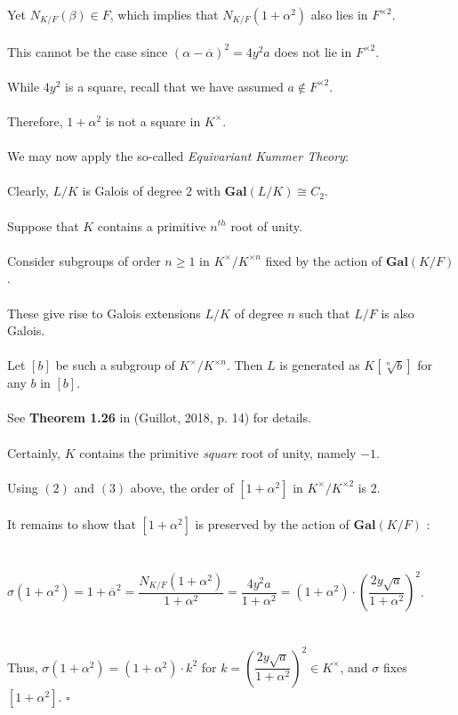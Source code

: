 \documentclass{article}
\begin{document}
Yet $N_{K/F}(\beta) \in F$, which implies that $N_{K/F}(1 + \alpha^2)$ also lies in $F^{\times2}$. \\\\
This cannot be the case since $(\alpha - \overline{\alpha})^2 = 4y^2a$  does not lie in $F^{\times2}$. \\\\
\indent While $4y^2$ is a square, recall that we have assumed $a \notin F^{\times2}$. \\\\
Therefore, $1 + \alpha^2$ is not a square in $K^{\times}$. \\\\
We may now apply the so-called \emph{Equivariant Kummer Theory}: \\\\
\indent Clearly, $L/K$ is Galois of degree $2$ with $\textbf{Gal}(L/K) \cong C_2$. \\\\
\indent Suppose that $K$ contains a primitive $n^{th}$ root of unity. \\\\
\indent Consider subgroups of order $n \geq 1$ in $K^\times/K^{\times n}$ fixed by the action of $\textbf{Gal}(K/F)$. \\\\
\indent These give rise to Galois extensions $L/K$ of degree $n$ such that $L/F$ is also Galois. \\\\
\indent Let $[b]$ be such a subgroup of $K^\times/K^{\times n}$. Then $L$ is generated as $K[\sqrt[n]{b}]$ for any $b$ in $[b]$.  \\\\
\indent See \textbf{Theorem 1.26} in (Guillot, 2018, p. 14) for details. \\\\
Certainly, $K$ contains the primitive \emph{square} root of unity, namely $-1$. \\\\
Using $(2)$ and $(3)$ above, the order of $[1 + \alpha^2]$ in $K^\times/K^{\times2}$ is $2$. \\\\
It remains to show that $[1 + \alpha^2]$ is preserved by the action of $\textbf{Gal}(K/F)$ : \\\\\\
\indent $\sigma(1 + \alpha^2) = 1 + \overline{\alpha}^2 = \dfrac{N_{K/F}(1 + \alpha^2)}{1 + \alpha^2} = \dfrac{4y^2a}{1 + \alpha^2} = (1 + \alpha^2) \cdot \left(\dfrac{2y\sqrt{a}}{1 + \alpha^2}\right)^2$. \\\\\\
Thus, $\sigma(1 + \alpha^2) = (1 + \alpha^2) \cdot k^2$ for $k = \left(\dfrac{2y\sqrt{a}}{1 + \alpha^2}\right)^2 \in K^\times$, and $\sigma$ fixes $[1 + \alpha^2]$. $\square$ \\\\
\\
\end{document}
